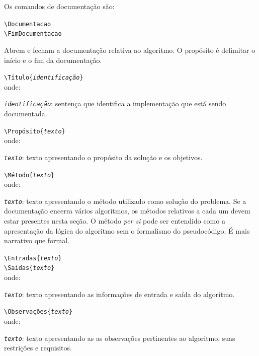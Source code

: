 \documentclass[a4paper,12pt,oneside,onecolumn,final,fleqn]{repUERJ}
\begin{document}
Os comandos de documentação são:
\begin{alinea}
\item \texttt{\textbackslash Documentacao}\\
      \texttt{\textbackslash FimDocumentacao}
    \begin{alinea}
        \item Abrem e fecham a documentação relativa ao 
        algoritmo. O propósito é delimitar o início e o fim da
        documentação.
    \end{alinea}
    
\item \texttt{\textbackslash Título\{\textit{identificação}\}} \\
    onde:
    \begin{alinea}
        \item \texttt{\textit{identificação}}: sentença que 
        identifica a implementação que está sendo documentada.
    \end{alinea}
\item \texttt{\textbackslash Propósito\{\textit{texto}\}} \\
    onde:
    \begin{alinea}
        \item \texttt{\textit{texto}}: texto apresentando o 
        propósito da solução e os objetivos.
    \end{alinea}
\item \texttt{\textbackslash Método\{\textit{texto}\}} \\
    onde:
    \begin{alinea}
        \item \texttt{\textit{texto}}: texto apresentando o 
        método utilizado como solução do problema. Se a 
        documentação encerra vários algoritmos, os métodos 
        relativos a cada um devem estar presentes nesta 
        seção. O método \textit{per si} pode ser entendido 
        como a apresentação da lógica do algoritmo sem o
        formalismo do pseudocódigo. É mais narrativo que 
        formal.
    \end{alinea}
\item \texttt{\textbackslash Entradas\{\textit{texto}\}}\\
      \texttt{\textbackslash Saídas\{\textit{texto}\}}\\
    onde:
    \begin{alinea}
        \item \texttt{\textit{texto}}: texto apresentando as
        informações de entrada e saída do algoritmo.
    \end{alinea}
\item \texttt{\textbackslash Observações\{\textit{texto}\}} \\
    onde:
    \begin{alinea}
        \item \texttt{\textit{texto}}: texto apresentando as
        as observações pertinentes ao algoritmo, suas 
        restrições e requisitos.\\
    \end{alinea}
\end{alinea}
\end{document}

